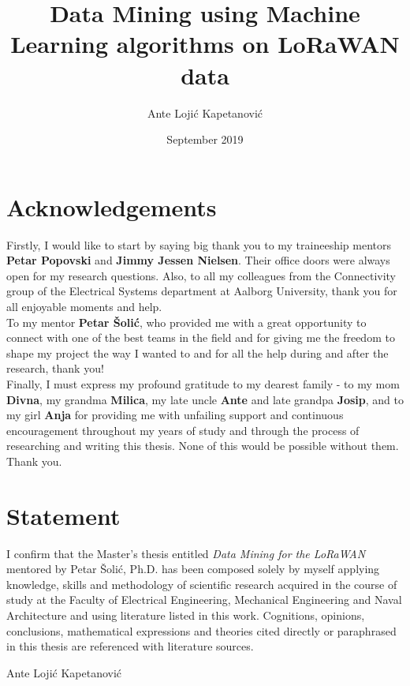 \documentclass[12pt,twoside]{report}
\title{Data Mining using Machine Learning algorithms on LoRaWAN data}
\author{Ante Lojić Kapetanović}
\date{September 2019}
\begin{document}





\chapter*{Acknowledgements}
Firstly, I would like to start by saying big thank you to my traineeship mentors \textbf{Petar Popovski} and 
\textbf{Jimmy Jessen Nielsen}. Their office doors were always open for my research questions. Also, to all my 
colleagues from the Connectivity group of the Electrical Systems department at Aalborg University, thank you for
all enjoyable moments and help.\\

To my mentor \textbf{Petar Šolić}, who provided me with a great opportunity to connect with one of the best teams in the 
field and for giving me the freedom to shape my project the way I wanted to and for all the help during and after the research, thank you!\\

Finally, I must express my profound gratitude to my dearest family - to my mom \textbf{Divna}, my grandma \textbf{Milica}, my late uncle \textbf{Ante} and late grandpa \textbf{Josip}, and to my girl \textbf{Anja}
for providing me with unfailing support and continuous encouragement throughout my years of study and through the 
process of researching and writing  this thesis. None of this would be possible without them. Thank you.


\chapter*{Statement}
I confirm that the Master's thesis entitled \emph{Data Mining for the LoRaWAN} mentored by 
Petar Šolić, Ph.D. has been composed solely by myself applying knowledge, skills 
and methodology of scientific research acquired in the course of study at the Faculty 
of Electrical Engineering, Mechanical Engineering and Naval Architecture and using 
literature listed in this work. Cognitions, opinions, conclusions, mathematical 
expressions and theories cited directly or paraphrased in this thesis are referenced 
with literature sources.

\vspace{2cm}
\hspace*{\fill}Ante Lojić Kapetanović
\end{document}

